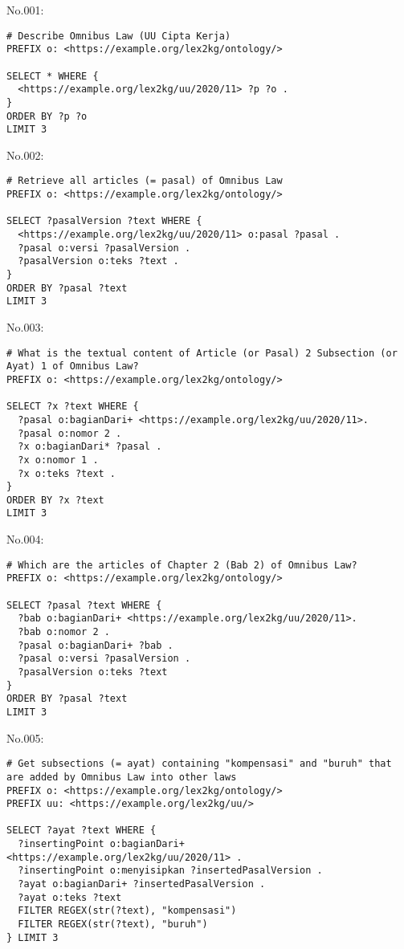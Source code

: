 \noindent No.001:
\begin{lstlisting}
# Describe Omnibus Law (UU Cipta Kerja)
PREFIX o: <https://example.org/lex2kg/ontology/>

SELECT * WHERE {
  <https://example.org/lex2kg/uu/2020/11> ?p ?o .
} 
ORDER BY ?p ?o
LIMIT 3
\end{lstlisting}


\noindent No.002:
\begin{lstlisting}
# Retrieve all articles (= pasal) of Omnibus Law
PREFIX o: <https://example.org/lex2kg/ontology/>

SELECT ?pasalVersion ?text WHERE {
  <https://example.org/lex2kg/uu/2020/11> o:pasal ?pasal .
  ?pasal o:versi ?pasalVersion .
  ?pasalVersion o:teks ?text .
} 
ORDER BY ?pasal ?text
LIMIT 3
\end{lstlisting}


\noindent No.003:
\begin{lstlisting}
# What is the textual content of Article (or Pasal) 2 Subsection (or Ayat) 1 of Omnibus Law?
PREFIX o: <https://example.org/lex2kg/ontology/>

SELECT ?x ?text WHERE {
  ?pasal o:bagianDari+ <https://example.org/lex2kg/uu/2020/11>.
  ?pasal o:nomor 2 .
  ?x o:bagianDari* ?pasal .
  ?x o:nomor 1 .
  ?x o:teks ?text .
}
ORDER BY ?x ?text
LIMIT 3
\end{lstlisting}


\noindent No.004:
\begin{lstlisting}
# Which are the articles of Chapter 2 (Bab 2) of Omnibus Law?
PREFIX o: <https://example.org/lex2kg/ontology/>

SELECT ?pasal ?text WHERE {
  ?bab o:bagianDari+ <https://example.org/lex2kg/uu/2020/11>.
  ?bab o:nomor 2 .
  ?pasal o:bagianDari+ ?bab .
  ?pasal o:versi ?pasalVersion .
  ?pasalVersion o:teks ?text
} 
ORDER BY ?pasal ?text
LIMIT 3
\end{lstlisting}


\noindent No.005:
\begin{lstlisting}
# Get subsections (= ayat) containing "kompensasi" and "buruh" that are added by Omnibus Law into other laws
PREFIX o: <https://example.org/lex2kg/ontology/>
PREFIX uu: <https://example.org/lex2kg/uu/>

SELECT ?ayat ?text WHERE {
  ?insertingPoint o:bagianDari+ <https://example.org/lex2kg/uu/2020/11> .
  ?insertingPoint o:menyisipkan ?insertedPasalVersion .
  ?ayat o:bagianDari+ ?insertedPasalVersion .
  ?ayat o:teks ?text
  FILTER REGEX(str(?text), "kompensasi")
  FILTER REGEX(str(?text), "buruh")
} LIMIT 3
\end{lstlisting}


